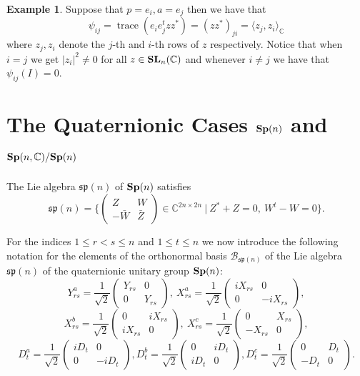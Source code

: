 \documentclass[11pt,reqno]{amsart}
\theoremstyle{plain}
\theoremstyle{definition}
\newtheorem{example}      [theorem]  {Example}
\numberwithin{equation}{section}
\def \cn{{\mathbb C}}
\def \B{\mathcal B}
\def \SLC#1{\text{\bf SL}_{#1}(\cn)}
\def \Sp#1{\text{\bf Sp}(#1)}
\def \sp#1{\mathfrak{sp}(#1)}
\def \SpC#1{\text{\bf Sp}(#1,\cn)}
\DeclareMathOperator{\trace}{trace}
\numberwithin{equation}{section}
\begin{document}
\begin{example}
Suppose that $p = e_i, a = e_j$ then we have that
$$ \psi_{ij} = \trace (e_i e_j^t  {z} z^*) = (z z^*)_{ji} = \langle z_j, z_i \rangle_\cn $$
where $z_j,z_i$ denote the $j$-th and $i$-th rows of $z$ respectively. Notice that when $i = j$ we get $|z_i|^2 \neq 0$ for all $z \in \SLC{n}$ and whenever $i \neq j$ we have that $\psi_{ij}(I) = 0$.

\end{example}

\section{The Quaternionic Cases $\Sp n$ and $\SpC {n}/\Sp n$}
\label{section-quaternionic-cases}
The Lie algebra $\sp n$ of $\Sp n$ satisfies
$$\sp{n}=\{\begin{pmatrix} Z & W
\\ -\bar W & \bar Z\end{pmatrix}\in\cn^{2n\times 2n}
\ |\ Z^*+Z=0,\ W^t-W=0\}.$$ 

For the indices $1\le r<s\le n$ and $1\le t\le n$ we now  introduce the following notation for the elements of the orthonormal basis $\B_{\sp n}$ of the Lie algebra $\sp n$ of the quaternionic unitary group $\Sp n$:
$$Y^a_{rs}=\frac 1{\sqrt 2}
\begin{pmatrix}
Y_{rs} & 0 \\
     0 & Y_{rs}
\end{pmatrix},\  
X^a_{rs}=\frac 1{\sqrt 2}
\begin{pmatrix}
iX_{rs} & 0 \\
      0 & -iX_{rs}
\end{pmatrix},$$
$$ X^b_{rs}=\frac 1{\sqrt 2}
\begin{pmatrix}
      0 & iX_{rs} \\
iX_{rs} & 0\end{pmatrix},\ 
X^c_{rs}=\frac 1{\sqrt 2}
\begin{pmatrix}
      0 & X_{rs} \\
-X_{rs} & 0
\end{pmatrix},$$
$$D^a_{t}=\frac 1{\sqrt 2}
\begin{pmatrix}
iD_{t} & 0 \\
     0 & -iD_{t}
\end{pmatrix},
D^b_{t}=\frac 1{\sqrt 2}
\begin{pmatrix}
     0 & iD_{t}  \\
iD_{t} & 0
\end{pmatrix},
D^c_{t}=\frac 1{\sqrt 2}
\begin{pmatrix}
     0 & D_{t}  \\
-D_{t} & 0
\end{pmatrix}.$$
\smallskip
\end{document}
